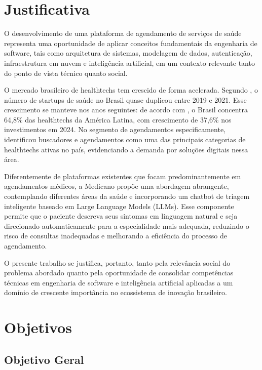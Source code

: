 \section{Justificativa}
\label{sec:justification}

O desenvolvimento de uma plataforma de agendamento de serviços
de saúde representa uma oportunidade de aplicar conceitos
fundamentais da engenharia de software, tais como arquitetura
de sistemas, modelagem de dados, autenticação, infraestrutura
em nuvem e inteligência artificial, em um contexto relevante
tanto do ponto de vista técnico quanto social.

O mercado brasileiro de healthtechs tem crescido de forma
acelerada. Segundo , o número
de startups de saúde no Brasil quase duplicou entre 2019 e 2021.
Esse crescimento se manteve nos anos seguintes: de acordo com
, o Brasil concentra 64,8\% das
healthtechs da América Latina, com crescimento de 37,6\% nos
investimentos em 2024. No segmento de agendamentos
especificamente,  identificou
buscadores e agendamentos como uma das principais categorias
de healthtechs ativas no país, evidenciando a demanda por
soluções digitais nessa área.

Diferentemente de plataformas existentes que focam
predominantemente em agendamentos médicos, a Medicano propõe
uma abordagem abrangente, contemplando diferentes áreas da
saúde e incorporando um chatbot de triagem inteligente baseado
em Large Language Models (LLMs). Esse componente permite que
o paciente descreva seus sintomas em linguagem natural e seja
direcionado automaticamente para a especialidade mais adequada,
reduzindo o risco de consultas inadequadas e melhorando a
eficiência do processo de agendamento.

O presente trabalho se justifica, portanto, tanto pela
relevância social do problema abordado quanto pela oportunidade
de consolidar competências técnicas em engenharia de software
e inteligência artificial aplicadas a um domínio de crescente
importância no ecossistema de inovação brasileiro.

\section{Objetivos}
\label{sec:objectives}

\subsection{Objetivo Geral}
\label{subsec:general-objective}

